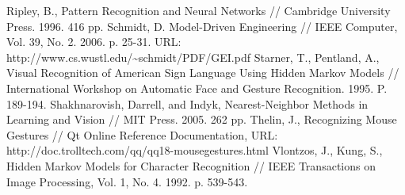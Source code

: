\documentclass[a5paper]{article}
\begin{document}
\begin{thebibliography}{9001}
   Ripley, B., Pattern Recognition and Neural Networks // Cambridge University Press. 1996. 416 pp.
   Schmidt, D. Model-Driven Engineering // IEEE Computer, Vol. 39, No. 2. 2006. p. 25-31. URL: http://www.cs.wustl.edu/\textasciitilde schmidt/PDF/GEI.pdf
   Starner, T., Pentland, A., Visual Recognition of American Sign Language Using Hidden Markov Models // International Workshop on Automatic Face and Gesture Recognition. 1995. P. 189-194.
   Shakhnarovish, Darrell, and Indyk, Nearest-Neighbor Methods in Learning and Vision // MIT Press. 2005. 262 pp.
   Thelin, J., Recognizing Mouse Gestures // Qt Online Reference Documentation, URL: http://doc.trolltech.com/qq/qq18-mousegestures.html 
   Vlontzos, J., Kung, S., Hidden Markov Models for Character Recognition // IEEE Transactions on Image Processing, Vol. 1, No. 4. 1992. p. 539-543.
\end{thebibliography}  
\end{document}
